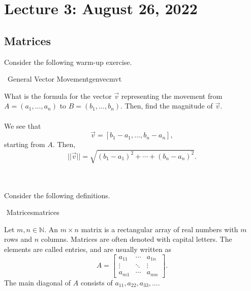 \pagebreak

\section{Lecture 3: August 26, 2022}

    \subsection{Matrices}

        Consider the following warm-up exercise.
        \begin{exercise}{\Difficulty\,\Difficulty\,\,General Vector Movement}{genvecmvt}

            What is the formula for the vector \(\vec{v}\) representing the movement from \(A=(a_1,\ldots,a_n)\) to \(B=(b_1,\ldots,b_n)\). Then, find the magnitude of \(\vec{v}\).
            \\
            \\
            We see that
            \begin{equation*}
                \vec{v}=[b_1-a_1,\ldots,b_n-a_n],
            \end{equation*}
            starting from \(A\). Then,
            \begin{equation*}
                ||\vec{v}||=\sqrt{(b_1-a_1)^2+\cdots+(b_n-a_n)^2}.
            \end{equation*}
        
        \end{exercise}
        \vphantom
        \\
        \\
        Consider the following definitions.
        \begin{definition}{\Stop\,\,Matrices}{matrices}
        
            Let \(m,n\in\mathbb{N}\). An \(m\times n\) matrix is a rectangular array of real numbers with \(m\) rows and \(n\) columns. Matrices are often denoted with capital letters. The elements are called entries, and are usually written as
            \begin{equation*}
                A=\begin{bmatrix} a_{11} & \cdots & a_{1n} \\ \vdots & \ddots & \vdots \\ a_{m1} & \cdots & a_{mn} \end{bmatrix}.
            \end{equation*}
            The main diagonal of \(A\) consists of \(a_{11},a_{22},a_{33},\ldots\).
        
        \end{definition}
